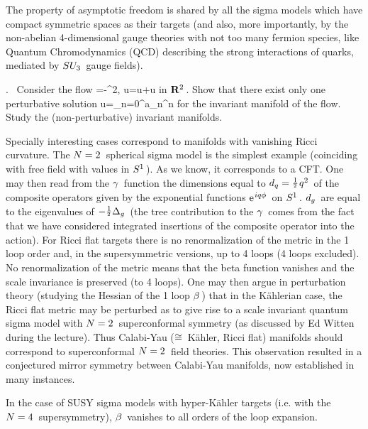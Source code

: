 The property of asymptotic freedom is shared by all the
sigma models which have compact symmetric spaces as their
targets (and also, more importantly, by the non-abelian
4-dimensional gauge theories with not too many fermion species,
like Quantum Chromodynamics (QCD) describing the strong
interactions of quarks, mediated by \s$SU_3\hspace{0.05cm}$ gauge fields).
\vskip 0.5cm


. \ Consider the flow
\qq
{}\m\alpha\s=\s-\alpha^2\s,\quad\quad
{}\m u\s=\m u\s+\s u\m\alpha
\qqq
in \s${{\bf R}}^2\hspace{0.05cm}$. Show that there exist only one perturbative
solution
\qq
u\s=\s\sum\limits_{n=0}^\infty a_n\m\alpha^n
\qqq
for the invariant manifold of the flow. Study the
(non-perturbative) invariant manifolds.
\vskip 0.5cm


Specially interesting cases correspond to manifolds with
vanishing Ricci curvature. The \s$N=2\hspace{0.05cm}$ spherical
sigma model is the simplest example
(coinciding with free field with values in \s$S^1\hspace{0.05cm}$).
As we know, it corresponds to a CFT.
One may then read from the \s$\gamma\hspace{0.05cm}$ function the
dimensions equal to \s$d_q={1\over^2}\hspace{0.025cm} q^2\hspace{0.05cm}$ of the composite
operators given by the exponential functions \s${\rm e}^{\hspace{0.025cm} iq\phi}\hspace{0.05cm}$
on \s$S^1\hspace{0.05cm}$. \s$d_g\hspace{0.05cm}$ are equal to the eigenvalues
of \s$-{1\over^2}\Delta_g\hspace{0.05cm}$ (the tree contribution to
the \s$\gamma\hspace{0.05cm}$ comes from the fact that we have considered
integrated insertions of the composite operator into
the action). For Ricci flat targets there is no
renormalization of the metric in the 1 loop order and,
in the supersymmetric versions, up to 4 loops (4 loops
excluded). No renormalization of the metric means that
the beta function vanishes and the scale invariance
is preserved (to 4 loops). One may then argue in perturbation
theory (studying the Hessian of the 1 loop \s$\beta\hspace{0.05cm}$)
that in the K\"{a}hlerian case, the Ricci flat metric may
be perturbed as to give rise to a scale invariant
quantum sigma model with \s$N=2\hspace{0.05cm}$ superconformal
symmetry (as discussed by Ed Witten during the lecture).
Thus Calabi-Yau (\s$\cong\hspace{0.05cm}$ K\"{a}hler, Ricci flat) manifolds
should correspond to superconformal \s$N=2\hspace{0.05cm}$ field theories.
This observation resulted in a conjectured mirror symmetry
between Calabi-Yau manifolds, now established in many instances.
\vskip 0.2cm

In the case of SUSY sigma models with hyper-K\"{a}hler targets
(i.e. with the \s$N=4\hspace{0.05cm}$ supersymmetry), \s$\beta\hspace{0.05cm}$ vanishes to
all orders of the loop expansion.
\vskip 0.3cm


